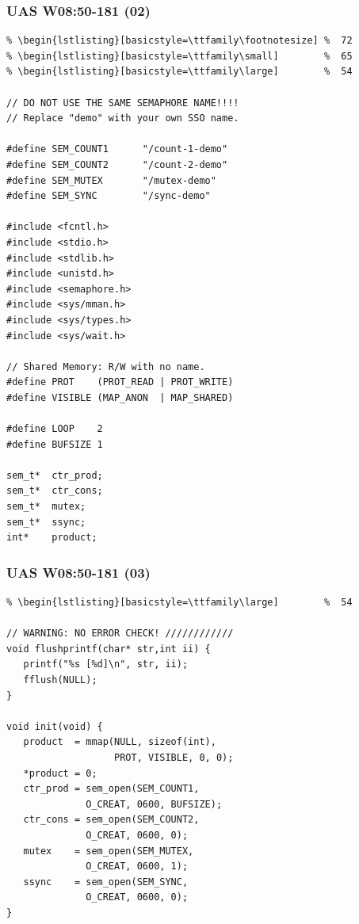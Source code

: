 \documentclass[xcolor=table, notheorems, hyperref={pdfpagelabels=false}]{beamer}
\begin{document}
\begin{frame}[fragile]
\frametitle{UAS W08:50-181 (02)}
\begin{lstlisting}[basicstyle=\ttfamily\tiny]         % 108
% \begin{lstlisting}[basicstyle=\ttfamily\tiny]         % 108
% \begin{lstlisting}[basicstyle=\ttfamily\footnotesize] %  72
% \begin{lstlisting}[basicstyle=\ttfamily\small]        %  65
% \begin{lstlisting}[basicstyle=\ttfamily\large]        %  54

// DO NOT USE THE SAME SEMAPHORE NAME!!!!
// Replace "demo" with your own SSO name.

#define SEM_COUNT1      "/count-1-demo"
#define SEM_COUNT2      "/count-2-demo"
#define SEM_MUTEX       "/mutex-demo"
#define SEM_SYNC        "/sync-demo"

#include <fcntl.h>
#include <stdio.h>
#include <stdlib.h>
#include <unistd.h>
#include <semaphore.h>
#include <sys/mman.h>
#include <sys/types.h>
#include <sys/wait.h>

// Shared Memory: R/W with no name.
#define PROT    (PROT_READ | PROT_WRITE)
#define VISIBLE (MAP_ANON  | MAP_SHARED)

#define LOOP    2
#define BUFSIZE 1

sem_t*  ctr_prod;
sem_t*  ctr_cons;
sem_t*  mutex;
sem_t*  ssync;
int*    product;

\end{lstlisting}
\end{frame}

\begin{frame}[fragile]
\frametitle{UAS W08:50-181 (03)}
\begin{lstlisting}[basicstyle=\ttfamily\footnotesize] %  72
% \begin{lstlisting}[basicstyle=\ttfamily\small]        %  65
% \begin{lstlisting}[basicstyle=\ttfamily\large]        %  54

// WARNING: NO ERROR CHECK! ////////////
void flushprintf(char* str,int ii) {
   printf("%s [%d]\n", str, ii);
   fflush(NULL);
}

void init(void) {
   product  = mmap(NULL, sizeof(int), 
                   PROT, VISIBLE, 0, 0);
   *product = 0;
   ctr_prod = sem_open(SEM_COUNT1, 
              O_CREAT, 0600, BUFSIZE);
   ctr_cons = sem_open(SEM_COUNT2, 
              O_CREAT, 0600, 0);
   mutex    = sem_open(SEM_MUTEX, 
              O_CREAT, 0600, 1);
   ssync    = sem_open(SEM_SYNC, 
              O_CREAT, 0600, 0);
}

\end{lstlisting}
\end{frame}
\end{document}
